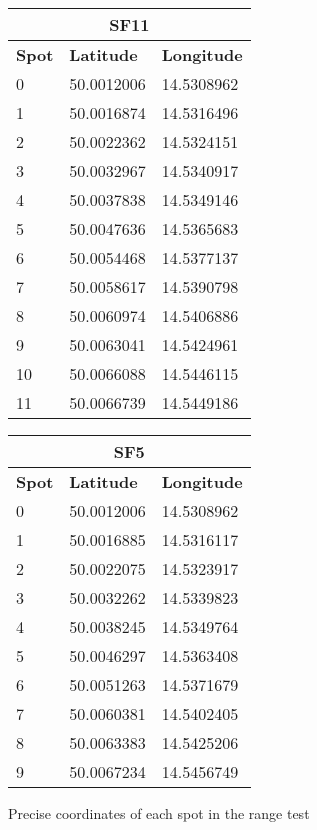 \begin{figure}[H]
    \centering
    \begin{minipage}[t]{.45\textwidth}
        \centering
        \vspace{0em}
        \begin{tabular}{|l|l|l|}
        \multicolumn{3}{c}{\textbf{SF11}} \\ \hline
        \textbf{Spot} & \textbf{Latitude} & \textbf{Longitude} \\ \hline
        0   & 50.0012006 & 14.5308962 \\ \hline
        1   & 50.0016874 & 14.5316496 \\ \hline
        2   & 50.0022362 & 14.5324151 \\ \hline
        3   & 50.0032967 & 14.5340917 \\ \hline
        4   & 50.0037838 & 14.5349146 \\ \hline
        5   & 50.0047636 & 14.5365683 \\ \hline
        6   & 50.0054468 & 14.5377137 \\ \hline
        7   & 50.0058617 & 14.5390798 \\ \hline
        8   & 50.0060974 & 14.5406886 \\ \hline
        9   & 50.0063041 & 14.5424961 \\ \hline
        10  & 50.0066088 & 14.5446115 \\ \hline
        11  & 50.0066739 & 14.5449186 \\ \hline
        \end{tabular}
    \end{minipage}
    \begin{minipage}[t]{.45\textwidth}
        \centering
        \vspace{0em}
        \begin{tabular}{|l|l|l|}
        \multicolumn{3}{c}{\textbf{SF5}} \\ \hline
        \textbf{Spot} & \textbf{Latitude} & \textbf{Longitude} \\ \hline
        0   & 50.0012006 & 14.5308962 \\ \hline
        1   & 50.0016885 & 14.5316117 \\ \hline
        2   & 50.0022075 & 14.5323917 \\ \hline
        3   & 50.0032262 & 14.5339823 \\ \hline
        4   & 50.0038245 & 14.5349764 \\ \hline
        5   & 50.0046297 & 14.5363408 \\ \hline
        6   & 50.0051263 & 14.5371679 \\ \hline
        7   & 50.0060381 & 14.5402405 \\ \hline
        8   & 50.0063383 & 14.5425206 \\ \hline
        9   & 50.0067234 & 14.5456749 \\ \hline
        \end{tabular}
    \end{minipage}
    \caption{Precise coordinates of each spot in the range test}
\end{figure}

